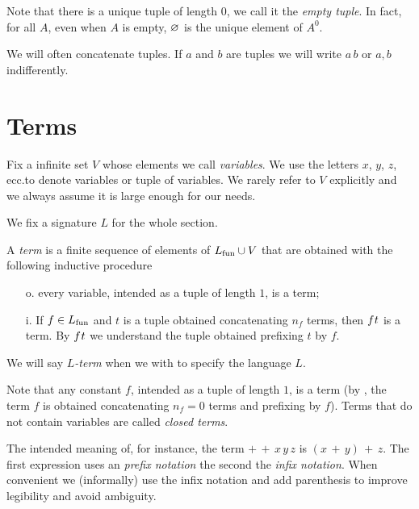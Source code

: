 Note that there is a unique tuple of length $0$, we call it the \emph{empty tuple\/}. In fact, for all $A$, even when $A$ is empty, $\varnothing$ is the unique element of $A^{0}$. 

We will often concatenate tuples. If $a$ and $b$ are tuples we will write \emph{$a\,b$\/} or \emph{$a,b$\/} indifferently. 




\section{Terms}\label{terminidef}
Fix a infinite set $V$ whose elements we call \emph{variables}. We use the letters $x$, $y$, $z$, ecc.\@ to denote variables or tuple of variables. We rarely refer to $V$ explicitly and we always assume it is large enough for our needs.

We fix a signature $L$ for the whole section.

\begin{definition}\label{deftermine} 
A \emph{term\/} is a finite sequence of elements of $L_{\rm fun}\cup V$ that are obtained with the following inductive procedure
\begin{itemize}
\item[o.] every variable, intended as a tuple of length $1$, is a term;
\item[i.] If $f\in L_{\rm fun}$ and $t$ is a tuple obtained concatenating $n_f$ terms, then $f\kern0.1ex t$ is a term. By $f\kern0.1ex t$ we understand the tuple obtained prefixing $t$ by $f$.
\end{itemize}
We will say \emph{$L$-term\/} when we with to specify the language $L$.\QED
\end{definition}

Note that any constant $f$, intended as a tuple of length $1$, is a term (by , the term $f$ is obtained concatenating $n_f=0$ terms and prefixing by $f$). Terms that do not contain variables are called \emph{closed terms}.

The intended meaning of, for instance, the term ${+}\,{+}\,x\,y\,z$ is $(x\,{+}\,y)\,{+}\,z$. The first expression uses an \emph{prefix notation\/} the second the \emph{infix notation}. When convenient we (informally) use the infix notation and add parenthesis to improve legibility and avoid ambiguity.

